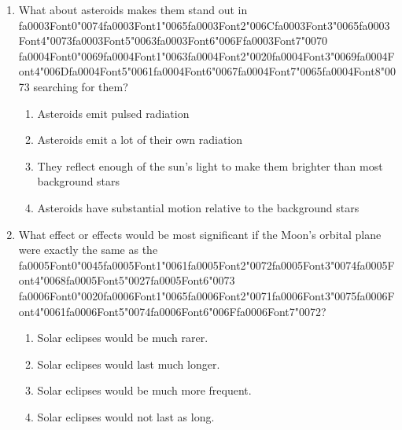 \documentclass[12pt]{article}
\begin{document}
\begin{enumerate}[label=\arabic*.]
ALH84001?
\begin{enumerate}[label=(\alph*)]
    \item Complex organic molecules specifically PAHs
    \item Magnetite grains similar to those formed by bacteria on Earth
    \item Carbonate minerals indicating a thicker warmer Martian atmosphere
    \item Amino acids with a preferred orientation or "chirality"
\end{enumerate}
\item What about asteroids makes them stand out in {\csname fa0003Font0\endcsname\char"0074}{\csname fa0003Font1\endcsname\char"0065}{\csname fa0003Font2\endcsname\char"006C}{\csname fa0003Font3\endcsname\char"0065}{\csname fa0003Font4\endcsname\char"0073}{\csname fa0003Font5\endcsname\char"0063}{\csname fa0003Font6\endcsname\char"006F}{\csname fa0003Font7\endcsname\char"0070} {\csname fa0004Font0\endcsname\char"0069}{\csname fa0004Font1\endcsname\char"0063}{\csname fa0004Font2\endcsname\char"0020}{\csname fa0004Font3\endcsname\char"0069}{\csname fa0004Font4\endcsname\char"006D}{\csname fa0004Font5\endcsname\char"0061}{\csname fa0004Font6\endcsname\char"0067}{\csname fa0004Font7\endcsname\char"0065}{\csname fa0004Font8\endcsname\char"0073} searching for them?
\begin{enumerate}[label=(\alph*)]
    \item Asteroids emit pulsed radiation
    \item Asteroids emit a lot of their own radiation
    \item They reflect enough of the sun's light to make them brighter than most background stars
    \item Asteroids have substantial motion relative to the background stars
\end{enumerate}
\item What effect or effects would be most significant if the Moon's orbital plane were exactly
the same as the {\csname fa0005Font0\endcsname\char"0045}{\csname fa0005Font1\endcsname\char"0061}{\csname fa0005Font2\endcsname\char"0072}{\csname fa0005Font3\endcsname\char"0074}{\csname fa0005Font4\endcsname\char"0068}{\csname fa0005Font5\endcsname\char"0027}{\csname fa0005Font6\endcsname\char"0073} {\csname fa0006Font0\endcsname\char"0020}{\csname fa0006Font1\endcsname\char"0065}{\csname fa0006Font2\endcsname\char"0071}{\csname fa0006Font3\endcsname\char"0075}{\csname fa0006Font4\endcsname\char"0061}{\csname fa0006Font5\endcsname\char"0074}{\csname fa0006Font6\endcsname\char"006F}{\csname fa0006Font7\endcsname\char"0072}?
\begin{enumerate}[label=(\alph*)]
    \item Solar eclipses would be much rarer.
    \item Solar eclipses would last much longer.
    \item Solar eclipses would be much more frequent.
    \item Solar eclipses would not last as long.
\end{enumerate}
\end{enumerate}
\end{document}
